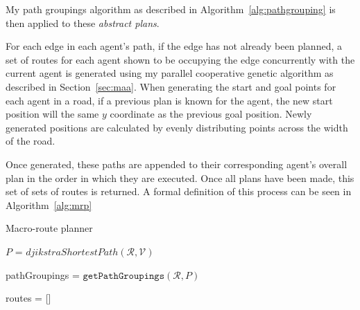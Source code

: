 My path groupings algorithm as described in Algorithm~\ref{alg:pathgrouping} is then applied to these \textit{abstract plans}.

For each edge in each agent's path, if the edge has not already been planned, a set of routes for each agent shown to be occupying the edge concurrently with the current agent is generated using my parallel cooperative genetic algorithm as described in Section~\ref{sec:maa}. When generating the start and goal points for each agent in a road, if a previous plan is known for the agent, the new start position will the same $y$ coordinate as the previous goal position. Newly generated positions are calculated by evenly distributing points across the width of the road.

Once generated, these paths are appended to their corresponding agent's overall plan in the order in which they are executed. Once all plans have been made, this set of sets of routes is returned. A formal definition of this process can be seen in Algorithm~\ref{alg:mrp}


\begin{algorithm}
  \caption{Macro-route planner}\label{alg:mrp}

  $P$ = $djikstraShortestPath(\mathcal{R},\mathcal{V})$

  pathGroupings = $\texttt{getPathGroupings}(\mathcal{R}, P)$

  routes = [] 



\end{algorithm}


